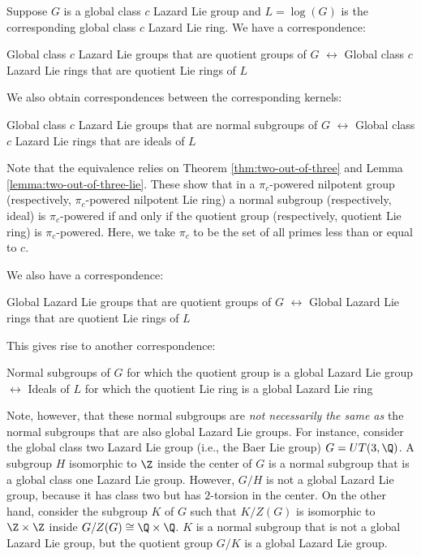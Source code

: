 \documentclass{ucetd}
\begin{document}
Suppose $G$ is a global class $c$ Lazard Lie group and $L = \log(G)$
is the corresponding global class $c$ Lazard Lie ring. We have a
correspondence:

\begin{center}
  Global class $c$ Lazard Lie groups that are quotient groups of $G$
  $\leftrightarrow$ Global class $c$ Lazard Lie rings that are
  quotient Lie rings of $L$
\end{center}

We also obtain correspondences between the corresponding kernels:

\begin{center}
  Global class $c$ Lazard Lie groups that are normal subgroups of $G$
  $\leftrightarrow$ Global class $c$ Lazard Lie rings that are ideals
  of $L$
\end{center}

Note that the equivalence relies on Theorem \ref{thm:two-out-of-three}
and Lemma \ref{lemma:two-out-of-three-lie}. These show that in a
$\pi_c$-powered nilpotent group (respectively, $\pi_c$-powered
nilpotent Lie ring) a normal subgroup (respectively, ideal) is
$\pi_c$-powered if and only if the quotient group (respectively,
quotient Lie ring) is $\pi_c$-powered. Here, we take $\pi_c$ to be the
set of all primes less than or equal to $c$.

We also have a correspondence:

\begin{center}
  Global Lazard Lie groups that are quotient groups of $G$
  $\leftrightarrow$ Global Lazard Lie rings that are quotient Lie
  rings of $L$
\end{center}

This gives rise to another correspondence:

\begin{center}
  Normal subgroups of $G$ for which the quotient group is a global
  Lazard Lie group $\leftrightarrow$ Ideals of $L$ for which the
  quotient Lie ring is a global Lazard Lie ring
\end{center}

Note, however, that these normal subgroups are {\em not necessarily
  the same as} the normal subgroups that are also global Lazard Lie
groups. For instance, consider the global class two Lazard Lie group
(i.e., the Baer Lie group) $G = UT(3,\Q)$. A subgroup $H$ isomorphic
to $\Z$ inside the center of $G$ is a normal subgroup that is a global
class one Lazard Lie group. However, $G/H$ is not a global Lazard Lie
group, because it has class two but has $2$-torsion in the center. On
the other hand, consider the subgroup $K$ of $G$ such that $K/Z(G)$ is
isomorphic to $\Z \times \Z$ inside $G/Z(G) \cong \Q \times \Q$. $K$
is a normal subgroup that is not a global Lazard Lie group, but the
quotient group $G/K$ is a global Lazard Lie group.
\end{document}
